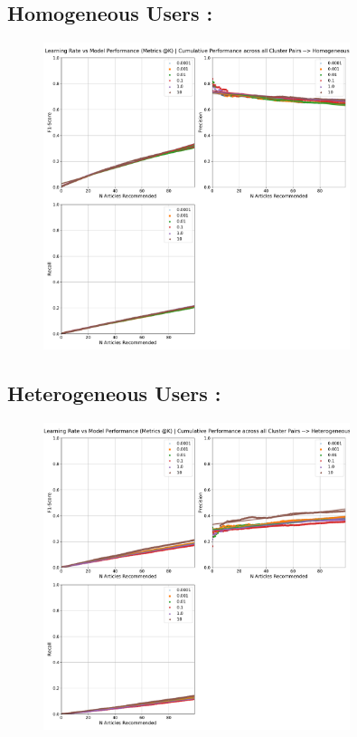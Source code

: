 \documentclass[a4paper,fontsize=8.0pt]{scrartcl}
\begin{document}
\subsection{Homogeneous Users :}
\vspace{-3ex}
\begin{figure}[H]
 \includegraphics[width=0.8\textwidth]{Graphs/lr_vs_model_performance_cumu_Homogeneous.pdf}
\end{figure}
\subsection{Heterogeneous Users :}
\vspace{-3ex}
\begin{figure}[H]
 \includegraphics[width=0.8\textwidth]{Graphs/lr_vs_model_performance_cumu_Heterogeneous.pdf}
\end{figure}
\end{document}
